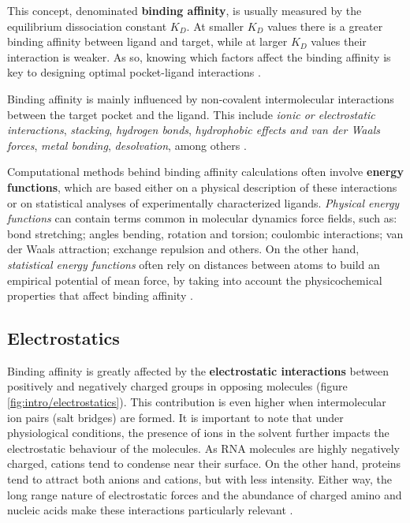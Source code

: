     This concept, denominated \textbf{binding affinity}, is usually measured by the equilibrium dissociation constant $K_D$. At smaller $K_D$ values there is a greater binding affinity between ligand and target, while at larger $K_D$ values their interaction is weaker. As so, knowing which factors affect the binding affinity is key to designing optimal pocket-ligand interactions \cite{binding_affinity_web}.

    Binding affinity is mainly influenced by non-covalent intermolecular interactions between the target pocket and the ligand. This include \textit{ionic or electrostatic interactions}, \textit{stacking}, \textit{hydrogen bonds}, \textit{hydrophobic effects and van der Waals forces}, \textit{metal bonding}, \textit{desolvation}, among others \cite{binding_affinity_2016, binding_affinity_web, electrostatics_2020, stacking_binding_2020, stacking_trp_2022, hbonds_2023, hydrophobic_2017, hydrophobic_2022}.

    Computational methods behind binding affinity calculations often involve \textbf{energy functions}, which are based either on a physical description of these interactions or on statistical analyses of experimentally characterized ligands. \textit{Physical energy functions} can contain terms common in molecular dynamics force fields, such as: bond stretching; angles bending, rotation and torsion; coulombic interactions; van der Waals attraction; exchange repulsion and others. On the other hand, \textit{statistical energy functions} often rely on distances between atoms to build an empirical potential of mean force, by taking into account the physicochemical properties that affect binding affinity \cite{binding_affinity_2016}.

  \subsection{Electrostatics}
    Binding affinity is greatly affected by the \textbf{electrostatic interactions} between positively and negatively charged groups in opposing molecules (figure \ref{fig:intro/electrostatics}). This contribution is even higher when intermolecular ion pairs (salt bridges) are formed. It is important to note that under physiological conditions, the presence of ions in the solvent further impacts the electrostatic behaviour of the molecules. As RNA molecules are highly negatively charged, cations tend to condense near their surface. On the other hand, proteins tend to attract both anions and cations, but with less intensity. Either way, the long range nature of electrostatic forces and the abundance of charged amino and nucleic acids make these interactions particularly relevant \cite{electrostatics_2020, electrostatics_2019, apbs_2004}.

